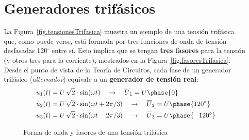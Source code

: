 	
	
	\section{Generadores trifásicos}
	La Figura~\ref{fig.tensionesTrifasica} muestra un ejemplo de una tensión trifásica que, como puede verse, está formada por tres funciones de onda de tensión desfasadas 120$^\circ$ entre sí. Esto implica que se tengan \textbf{tres fasores} para la tensión (y otros tres para la corriente), mostrados en la Figura~\ref{fig.fasoresTrifasica}.  Desde el punto de vista de la Teoría de Circuitos, cada fase de un generador trifásico (\textit{alternador}) equivale a un \textbf{generador de tensión real}:
	\begin{align*}
		u_1(t) &= U\,\sqrt{2}\cdot \sin(\omega t) \quad\rightarrow\quad  \overline{U}_1 = U\phase{0}\\
		u_2(t) &= U\,\sqrt{2} \cdot\sin(\omega t + 2\pi/3) \quad\rightarrow\quad  \overline{U}_2 = U\phase{120^\circ}\\
		u_3(t) &= U\,\sqrt{2}\cdot \sin(\omega t - 2\pi/3) \quad\rightarrow\quad  \overline{U}_3 = U\phase{-120^\circ}
	\end{align*}
	\begin{figure}
		\centering
		 \hfill
		\caption{Forma de onda y fasores de una tensión trifásica}
		\label{fig.tensiontrifasica}
	\end{figure}
